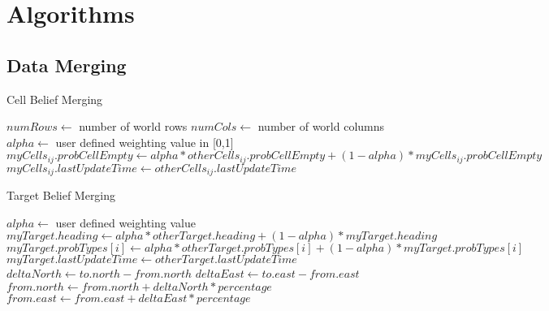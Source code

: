 
\chapter{Algorithms}
\label{sec:algorithms}


\section{Data Merging}
\begin{algorithm}[H]
	\caption{Cell Belief Merging}
	\label{alg:mergeCell}
	\begin{algorithmic}[1]
		\State $numRows\gets $ number of world rows
		\State $numCols\gets $ number of world columns
		\State $alpha\gets $ user defined weighting value in [0,1]
					\State $myCells_{ij}.probCellEmpty\gets alpha * otherCells_{ij}.probCellEmpty + (1-alpha) * myCells_{ij}.probCellEmpty$
					\State $myCells_{ij}.lastUpdateTime\gets otherCells_{ij}.lastUpdateTime$
				\EndIf
			\EndFor
		\EndFor
		\EndFunction
	\end{algorithmic}
\end{algorithm}

\begin{algorithm}[H]
	\caption{Target Belief Merging}
	\label{alg:mergeTarget}
	\begin{algorithmic}[1]
		\State $alpha\gets $ user defined weighting value
			\State $myTarget.heading\gets alpha * otherTarget.heading + (1-alpha)*myTarget.heading$
			\State {}
				\State $myTarget.probTypes[i]\gets alpha * otherTarget.probTypes[i] + (1-alpha)*myTarget.probTypes[i]$
			\EndFor
			\State $myTarget.lastUpdateTime\gets otherTarget.lastUpdateTime$
		\EndIf
		\EndFunction
		\\
			\State $deltaNorth\gets to.north - from.north$
			\State $deltaEast\gets to.east - from.east$
			\State $from.north\gets from.north + deltaNorth * percentage$
			\State $from.east\gets from.east + deltaEast * percentage$
		\EndFunction
	\end{algorithmic}
\end{algorithm}

